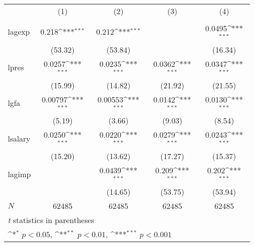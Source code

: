 {
\def\sym#1{\ifmmode^{#1}\else\(^{#1}\)\fi}
\begin{tabular}{l*{4}{c}}
\hline\hline
            &\multicolumn{1}{c}{(1)}&\multicolumn{1}{c}{(2)}&\multicolumn{1}{c}{(3)}&\multicolumn{1}{c}{(4)}\\
            &\multicolumn{1}{c}{} &\multicolumn{1}{c}{} &\multicolumn{1}{c}{} &\multicolumn{1}{c}{} \\
\hline
lagexp      &       0.218\sym{***}&       0.212\sym{***}&                     &      0.0495\sym{***}\\
            &     (53.32)         &     (53.84)         &                     &     (16.34)         \\
[1em]
lpres       &      0.0257\sym{***}&      0.0235\sym{***}&      0.0362\sym{***}&      0.0347\sym{***}\\
            &     (15.99)         &     (14.82)         &     (21.92)         &     (21.55)         \\
[1em]
lgfa        &     0.00797\sym{***}&     0.00553\sym{***}&      0.0142\sym{***}&      0.0130\sym{***}\\
            &      (5.19)         &      (3.66)         &      (9.03)         &      (8.54)         \\
[1em]
lsalary     &      0.0250\sym{***}&      0.0220\sym{***}&      0.0279\sym{***}&      0.0243\sym{***}\\
            &     (15.20)         &     (13.62)         &     (17.27)         &     (15.37)         \\
[1em]
lagimp      &                     &      0.0439\sym{***}&       0.209\sym{***}&       0.202\sym{***}\\
            &                     &     (14.65)         &     (53.75)         &     (53.94)         \\
\hline
\(N\)       &       62485         &       62485         &       62485         &       62485         \\
\hline\hline
\multicolumn{5}{l}{\footnotesize \textit{t} statistics in parentheses}\\
\multicolumn{5}{l}{\footnotesize \sym{*} \(p<0.05\), \sym{**} \(p<0.01\), \sym{***} \(p<0.001\)}\\
\end{tabular}
}

